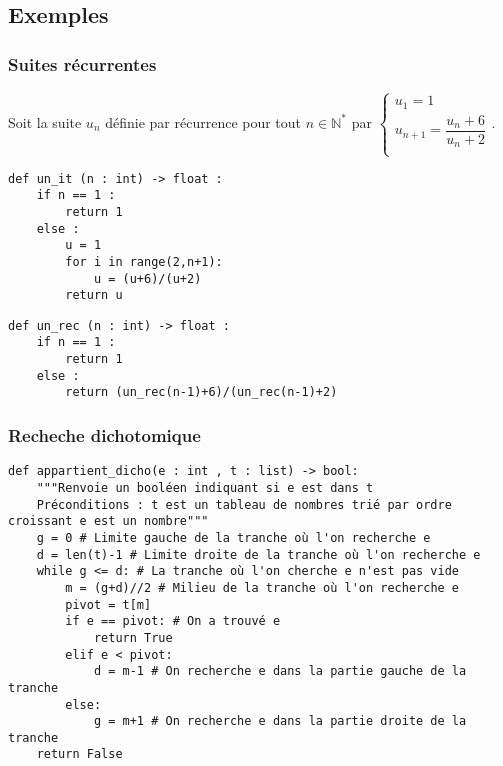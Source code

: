 \subsection*{Exemples}

\subsubsection*{Suites récurrentes}
Soit la suite $u_n$ définie par récurrence pour tout $n\in\mathbb{N}^*$ par 
$
\left\{
\begin{array}{ll} 
u_1 = 1 \\
u_{n+1} = \dfrac{u_n + 6}{u_n + 2} \\
\end{array}
\right.
$.

\noindent\begin{minipage}[c]{.45\linewidth}
\begin{lstlisting}
def un_it (n : int) -> float :
    if n == 1 :
        return 1
    else : 
        u = 1
        for i in range(2,n+1):
            u = (u+6)/(u+2)
        return u
\end{lstlisting}
\end{minipage} \hfill
\begin{minipage}[c]{.45\linewidth}
\begin{lstlisting}
def un_rec (n : int) -> float :
    if n == 1 :
        return 1
    else : 
        return (un_rec(n-1)+6)/(un_rec(n-1)+2)
\end{lstlisting}
\end{minipage} 

\subsubsection*{Recheche dichotomique}
\begin{lstlisting}
def appartient_dicho(e : int , t : list) -> bool:
    """Renvoie un booléen indiquant si e est dans t
    Préconditions : t est un tableau de nombres trié par ordre croissant e est un nombre"""
    g = 0 # Limite gauche de la tranche où l'on recherche e
    d = len(t)-1 # Limite droite de la tranche où l'on recherche e
    while g <= d: # La tranche où l'on cherche e n'est pas vide
        m = (g+d)//2 # Milieu de la tranche où l'on recherche e
        pivot = t[m]
        if e == pivot: # On a trouvé e
            return True
        elif e < pivot:
            d = m-1 # On recherche e dans la partie gauche de la tranche
        else:
            g = m+1 # On recherche e dans la partie droite de la tranche
    return False
\end{lstlisting}


